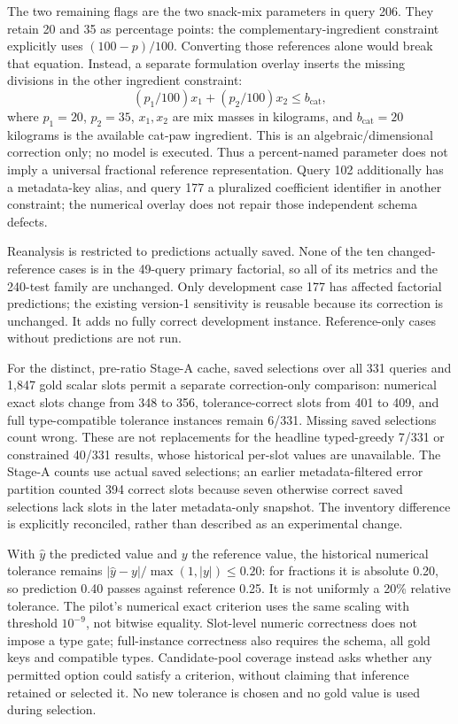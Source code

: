 The two remaining flags are the two snack-mix parameters in query 206.
They retain 20 and 35 as percentage points: the complementary-ingredient
constraint explicitly uses $(100-p)/100$. Converting those references alone
would break that equation. Instead, a separate formulation overlay inserts
the missing divisions in the other ingredient constraint:
\begin{equation}
 (p_1/100)x_1+(p_2/100)x_2\leq b_{\mathrm{cat}},
 \label{eq:snack-overlay}
\end{equation}
where $p_1=20$, $p_2=35$, $x_1,x_2$ are mix masses in kilograms, and
$b_{\mathrm{cat}}=20$ kilograms is the available cat-paw ingredient.
This is an algebraic/dimensional correction only; no model is executed.
Thus a percent-named parameter does not imply a universal fractional
reference representation. Query 102 additionally has a metadata-key alias,
and query 177 a pluralized coefficient identifier in another constraint;
the numerical overlay does not repair those independent schema defects.

Reanalysis is restricted to predictions actually saved. None of the ten
changed-reference cases is in the 49-query primary factorial, so all of its
metrics and the 240-test family are unchanged. Only development case 177
has affected factorial predictions; the existing version-1 sensitivity is
reusable because its correction is unchanged. It adds no fully correct
development instance. Reference-only cases without predictions are not run.

For the distinct, pre-ratio Stage-A cache, saved selections over all 331
queries and 1,847 gold scalar slots permit a separate correction-only
comparison: numerical exact slots change from 348 to 356, tolerance-correct
slots from 401 to 409, and full type-compatible tolerance instances remain
6/331. Missing saved selections count wrong. These are not replacements
for the headline typed-greedy 7/331 or constrained 40/331 results, whose
historical per-slot values are unavailable. The Stage-A counts use actual
saved selections; an earlier metadata-filtered error partition counted 394
correct slots because seven otherwise correct saved selections lack slots
in the later metadata-only snapshot. The inventory difference is explicitly
reconciled, rather than described as an experimental change.

With $\hat y$ the predicted value and $y$ the reference value, the historical numerical tolerance remains
$|\hat y-y|/\max(1,|y|)\leq0.20$: for fractions it is absolute 0.20,
so prediction 0.40 passes against reference 0.25. It is not uniformly a
20\% relative tolerance. The pilot's numerical exact criterion uses the
same scaling with threshold $10^{-9}$, not bitwise equality. Slot-level
numeric correctness does not impose a type gate; full-instance correctness
also requires the schema, all gold keys and compatible types. Candidate-pool
coverage instead asks whether any permitted option could satisfy a criterion,
without claiming that inference retained or selected it. No new tolerance
is chosen and no gold value is used during selection.
